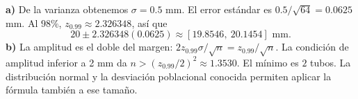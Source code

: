 \textbf{a)} De la varianza obtenemos $\sigma=0.5$ mm.
El error estándar es $0.5/\sqrt{64}=0.0625$ mm.
Al $98\%$, $z_{0.99}\approx2.326348$, así que
\[
20\pm2.326348(0.0625)
\approx\boxed{[19.8546,\ 20.1454]\text{ mm}}.
\]
\textbf{b)} La amplitud es el doble del margen:
$2z_{0.99}\sigma/\sqrt n=z_{0.99}/\sqrt n$.
La condición de amplitud inferior a 2 mm da
$n>(z_{0.99}/2)^2\approx1.3530$. El mínimo es $\boxed{2}$ tubos.
La distribución normal y la desviación poblacional conocida
permiten aplicar la fórmula también a ese tamaño.
